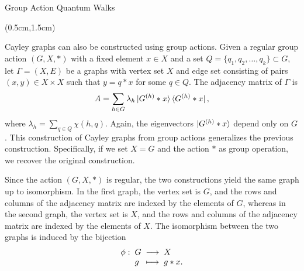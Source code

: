 \documentclass{beamer}
\theoremstyle{definition}
\begin{document}
\begin{frame}{Group Action Quantum Walks}
    
    \begin{textblock*}{12cm}(0.5cm,1.5cm)
               
        Cayley graphs can also be constructed using group actions. Given a regular group action $(G, X, *)$ with a fixed element $x \in X$ and a set  $Q = \{q_1, q_2, \dots, q_k\} \subset G$, let $\Gamma = (X, E)$ be a graphs with vertex set $X$ and edge set consisting of pairs $(x, y) \in X \times X$ such that $y = q * x$ for some $q \in Q$. The adjacency matrix of $\Gamma$ is
        \[ A = \sum_{h \in G} \lambda_h \ket{G^{(h)} * x} \bra{G^{(h)} * x}, \]
        where $\lambda_h = \sum_{q \in Q} \chi(h, q)$. Again, the eigenvectors $\ket{G^{(h)} * x}$ depend only on $G$. This construction of Cayley graphs from group actions generalizes the previous construction. Specifically, if we set $X = G$ and the action $*$ as group operation, we recover the original construction.

        Since the action $(G, X, *)$ is regular, the two constructions yield the same graph up to isomorphism. In the first graph, the vertex set is $G$, and the rows and columns of the adjacency matrix are indexed by the elements of $G$, whereas in the second graph, the vertex set is $X$, and the rows and columns of the adjacency matrix are indexed by the elements of $X$. The isomorphism between the two graphs is induced by the bijection
        \[
        \setlength{\arraycolsep}{1mm}
        \begin{array}{rlll}
            \phi: & G & \longrightarrow & X \\
            & g & \longmapsto & g * x.
        \end{array}
        \]
    \end{textblock*}

\end{frame}
\end{document}
